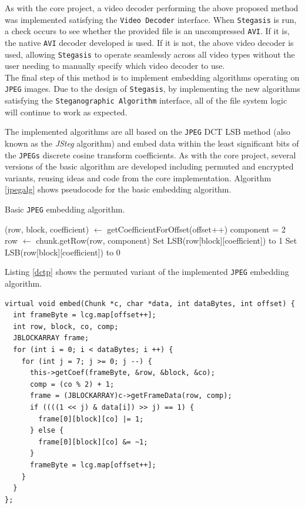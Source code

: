 \documentclass[paper=a4, fontsize=11pt,twoside]{scrartcl}    %
\numberwithin{table}{section}
\numberwithin{figure}{section}
\numberwithin{algorithm}{section}
\begin{document}
As with the core project, a video decoder performing the above proposed method was implemented satisfying the \texttt{Video Decoder} interface. When \texttt{Stegasis} is run, a check occurs to see whether the provided file is an uncompressed \texttt{AVI}. If it is, the native \texttt{AVI} decoder developed is used. If it is not, the above video decoder is used, allowing \texttt{Stegasis} to operate seamlessly across all video types without the user needing to manually specify which video decoder to use.\\

\noindent
The final step of this method is to implement embedding algorithms operating on \texttt{JPEG} images. Due to the design of \texttt{Stegasis}, by implementing the new algorithms satisfying the \texttt{Steganographic Algorithm} interface, all of the file system logic will continue to work as expected.

The implemented algorithms are all based on the \texttt{JPEG} DCT LSB method (also known as the \textit{JSteg} algorithm) and embed data within the least significant bits of the \texttt{JPEGs} discrete cosine transform coefficients. As with the core project, several versions of the basic algorithm are developed including permuted and encrypted variants, reusing ideas and code from the core implementation. Algorithm \ref{jpegalg} shows pseudocode for the basic embedding algorithm.

\begin{algorithm}
\caption{Basic \texttt{JPEG} embedding algorithm.}
\label{jpegalg}
\begin{algorithmic}[1]
		\State (row, block, coefficient) $\gets$ getCoefficientForOffset(offset++)
		\State component = 2
		\State row $\gets$ chunk.getRow(row, component)
			\State Set LSB(row[block][coefficient]) to 1
		\Else
			\State Set LSB(row[block][coefficient]) to 0
		\EndIf
	\EndFor
\EndFor
\end{algorithmic}
\end{algorithm}

Listing \ref{dctp} shows the permuted variant of the implemented \texttt{JPEG} embedding algorithm.

\begin{lstlisting}[caption={Permuted \texttt{JPEG} embedding algorithm (\texttt{steg/dctp\_algorithm.cc:48}).}, frame=single, label=dctp,upquote=true,float,floatplacement=!h]
virtual void embed(Chunk *c, char *data, int dataBytes, int offset) {
  int frameByte = lcg.map[offset++];
  int row, block, co, comp;
  JBLOCKARRAY frame; 
  for (int i = 0; i < dataBytes; i ++) {
    for (int j = 7; j >= 0; j --) {
      this->getCoef(frameByte, &row, &block, &co);
      comp = (co % 2) + 1;
      frame = (JBLOCKARRAY)c->getFrameData(row, comp);
      if ((((1 << j) & data[i]) >> j) == 1) {
        frame[0][block][co] |= 1;
      } else {
        frame[0][block][co] &= ~1;
      }
      frameByte = lcg.map[offset++];
    }
  }
};
\end{lstlisting}
\end{document}
